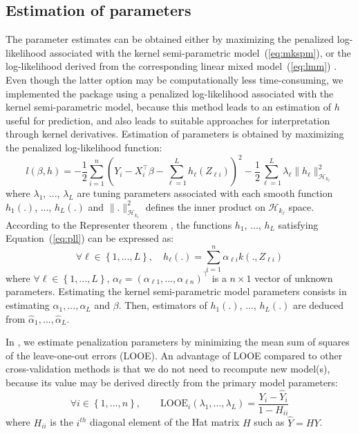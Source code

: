 \subsection{Estimation of parameters}  \label{sec:models-estimation}

The parameter estimates can be obtained either by maximizing the penalized log-likelihood associated with the kernel semi-parametric model~(\ref{eq:mkspm}), or the log-likelihood derived from the corresponding linear mixed model~(\ref{eq:lmm}) \citep{liu2007semiparametric}. Even though the latter option may be computationally less time-consuming, we implemented the  package using a penalized log-likelihood associated with the kernel semi-parametric model, because this method leads to an estimation of $h$ useful for prediction, and also leads to suitable approaches for interpretation through kernel derivatives. Estimation of parameters is obtained by maximizing the penalized log-likelihood function:
\begin{equation} \label{eq:pll}
l(\beta, h) = -\frac{1}{2}\sum\limits_{i = 1}^n \left(Y_i - X_i^\top\beta - \sum\limits_{\ell = 1}^L h_{\ell}(Z_{\ell i}) \right)^2 - \frac{1}{2}\sum\limits_{\ell = 1}^L \lambda_{\ell} \parallel h_{\ell}\parallel_{\mathcal{H}_{k_{\ell}}}^2
\end{equation}
where $\lambda_1$, ..., $\lambda_L$ are tuning parameters associated with each smooth function $h_1(.)$, ..., $h_L(.)$ and $\parallel .\parallel^2_{\mathcal{H}_{k_{\ell}}}$ defines the inner product on $\mathcal{H}_{k_{\ell}}$ space. According to the Representer theorem \citep{kimeldorf1971some}, the functions $h_1$, ..., $h_L$ satisfying Equation~(\ref{eq:pll}) can be expressed as:
\begin{equation}\label{eq:representer}
\forall \ell \in \left\lbrace 1,...,L \right\rbrace, \quad h_{\ell}(.) = \sum\limits_{i=1}^n \alpha_{\ell i} k(., Z_{\ell i})
\end{equation}
where $\forall \ell \in \left\lbrace 1,...,L \right\rbrace$, $\alpha_{\ell} = (\alpha_{\ell 1}, ..., \alpha_{\ell n})^\top$ is a $n \times 1$ vector of unknown parameters.
Estimating the kernel semi-parametric model parameters consists in estimating $\alpha_1, ..., \alpha_L$ and $\beta$. Then, estimators of $h_1(.)$, ..., $h_L(.)$ are deduced from $\hat{\alpha}_1, ..., \hat{\alpha}_L$. 



In , we estimate penalization parameters by minimizing the mean sum of squares of the leave-one-out errors (LOOE). An advantage of LOOE compared to other cross-validation methods is that we do not need to recompute new model(s), because its value may be derived directly from the primary model parameters:
\begin{equation} \label{eq:looe}
\forall i \in \left\lbrace 1, ..., n\right\rbrace, \qquad \text{LOOE}_i(\lambda_1, ...,\lambda_L) =  \frac{Y_i - \hat{Y}_i}{1-H_{ii}}
\end{equation}
where $H_{ii}$ is the $i^{th}$ diagonal element of the Hat matrix $H$ such as $\hat{Y} = H Y$. 



